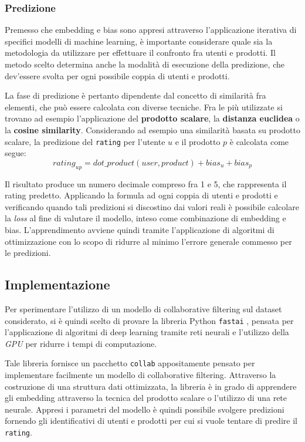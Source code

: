 \documentclass[hidelinks, 12pt]{article}
\begin{document}
\subsubsection{Predizione}

Premesso che embedding e bias sono appresi attraverso l'applicazione iterativa di specifici modelli di machine learning, è importante considerare quale sia la metodologia da utilizzare per effettuare il confronto fra utenti e prodotti. Il metodo scelto determina anche la modalità di esecuzione della predizione, che dev'essere svolta per ogni possibile coppia di utenti e prodotti.

La fase di predizione è pertanto dipendente dal concetto di similarità fra elementi, che può essere calcolata con diverse tecniche. Fra le più utilizzate si trovano ad esempio l'applicazione del \textbf{prodotto scalare}, la \textbf{distanza euclidea} o la \textbf{cosine similarity}. Considerando ad esempio una similarità basata su prodotto scalare, la predizione del \texttt{rating} per l'utente $u$ e il prodotto $p$ è calcolata come segue: 
\[rating_{up} = dot\_product(user, product) + bias_u + bias_p\]

Il risultato produce un numero decimale compreso fra 1 e 5, che rappresenta il rating predetto. Applicando la formula ad ogni coppia di utenti e prodotti e verificando quando tali predizioni si discostino dai valori reali è possibile calcolare la \textit{loss} al fine di valutare il modello, inteso come combinazione di embedding e bias. L'apprendimento avviene quindi tramite l'applicazione di algoritmi di ottimizzazione con lo scopo di ridurre al minimo l'errore generale commesso per le predizioni.



\subsection{Implementazione}

Per sperimentare l'utilizzo di un modello di collaborative filtering sul dataset considerato, si è quindi scelto di provare la libreria Python \texttt{fastai} \cite{site:fastai}, pensata per l'applicazione di algoritmi di deep learning tramite reti neurali e l'utilizzo della \textit{GPU} per ridurre i tempi di computazione.

Tale libreria fornisce un pacchetto \texttt{collab} appositamente pensato per implementare facilmente un modello di collaborative filtering. Attraverso la costruzione di una struttura dati ottimizzata, la libreria è in grado di apprendere gli embedding attraverso la tecnica del prodotto scalare o l'utilizzo di una rete neurale. Appresi i parametri del modello è quindi possibile svolgere predizioni fornendo gli identificativi di utenti e prodotti per cui si vuole tentare di predire il \texttt{rating}.
\end{document}
